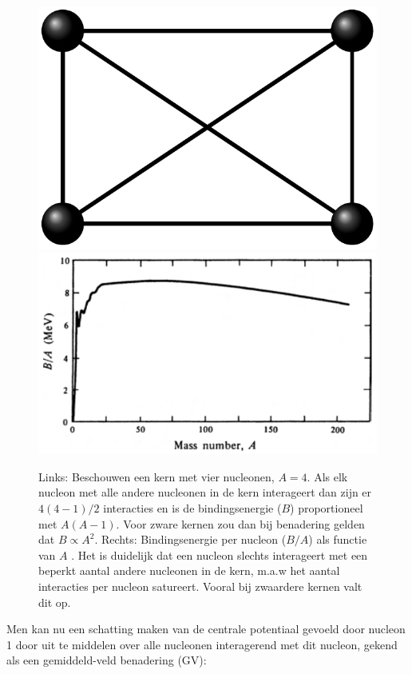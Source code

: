 \documentclass[11pt,twoside]{book}
\begin{document}
\begin{figure}
\centering 
\includegraphics[scale=0.55]{./figuren/saturation}
\includegraphics[scale=0.45]{./figuren/binding_energy.png}
\caption{Links: Beschouwen een kern met vier nucleonen, $A = 4$. Als elk nucleon met alle andere nucleonen in de kern interageert dan zijn er $4(4-1)/2$ interacties en is de bindingsenergie ($B$) proportioneel met $A(A-1)$. Voor zware kernen zou dan bij benadering gelden dat $B \propto A^2$. Rechts: Bindingsenergie per nucleon ($B/A$) als functie van $A$ \cite{henley}. Het is duidelijk dat een nucleon slechts interageert met een beperkt aantal andere nucleonen in de kern, m.a.w het aantal interacties per nucleon satureert. Vooral bij zwaardere kernen valt dit op.}
\label{fig:bindings_energie}
\end{figure}
Men kan nu een schatting maken van de centrale potentiaal gevoeld door nucleon 1 door uit te middelen over alle nucleonen interagerend met dit nucleon, gekend als een gemiddeld-veld benadering (GV):
\end{document}
